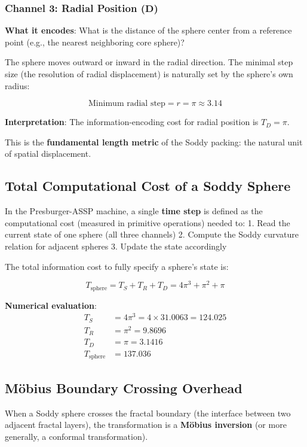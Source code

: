 \documentclass[11pt,a4paper]{article}
\begin{document}
  \subsubsection{Channel 3: Radial Position ($\mathbf{D}$)}

  \noindent\textbf{What it encodes}: What is the distance of the sphere center from a reference point (e.g., the nearest neighboring core sphere)?

  The sphere moves outward or inward in the radial direction. The minimal step size (the resolution of radial displacement) is naturally set by the sphere's own radius:

  \[
  \text{Minimum radial step} = r = \pi \approx 3.14
  \]

  \noindent\textbf{Interpretation}: The information-encoding cost for radial position is $T_D = \pi$.

  \noindent This is the \textbf{fundamental length metric} of the Soddy packing: the natural unit of spatial displacement.

  \subsection{Total Computational Cost of a Soddy Sphere}

  In the Presburger-ASSP machine, a single \textbf{time step} is defined as the computational cost (measured in primitive operations) needed to:
  1. Read the current state of one sphere (all three channels)
  2. Compute the Soddy curvature relation for adjacent spheres
  3. Update the state accordingly

  The total information cost to fully specify a sphere's state is:

  \[
  T_{\text{sphere}} = T_S + T_R + T_D = 4\pi^3 + \pi^2 + \pi
  \]

  \noindent\textbf{Numerical evaluation}:
  \begin{align*}
  T_S &= 4\pi^3 = 4 \times 31.0063 = 124.025 \\
  T_R &= \pi^2 = 9.8696 \\
  T_D &= \pi = 3.1416 \\
  T_{\text{sphere}} &= 137.036
  \end{align*}

  \subsection{Möbius Boundary Crossing Overhead}

  When a Soddy sphere crosses the fractal boundary (the interface between two adjacent fractal layers), the transformation is a \textbf{Möbius inversion} (or more generally, a conformal transformation).
\end{document}
